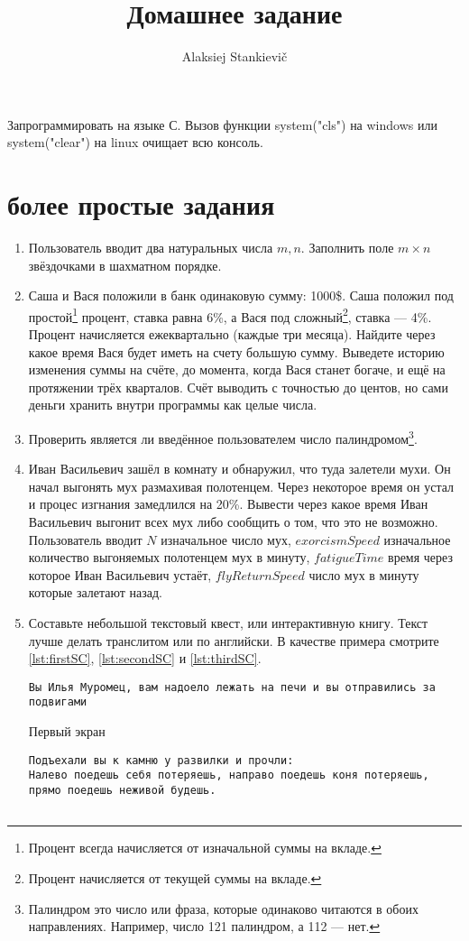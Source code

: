 \documentclass[12pt]{article}
\author{Alaksiej Stankievič}
\title{Домашнее задание}
\begin{document}

 Запрограммировать на языке С. Вызов функции system("cls") на windows или system("clear") на  linux очищает всю консоль.
 \section{более простые задания}
 \begin{enumerate}
\item Пользователь вводит два натуральных числа $m, n$. Заполнить поле $m\times{}n$ звёздочками в шахматном порядке.
  \item Саша и Вася положили в банк одинаковую сумму: 1000\$. Саша положил под простой\footnote{Процент всегда 
  начисляется от изначальной суммы на вкладе.} процент, ставка равна 6\%, а Вася под сложный\footnote{Процент 
начисляется от текущей суммы на вкладе.}, ставка --- 4\%. Процент начисляется ежеквартально (каждые три месяца). 
Найдите 
через какое время Вася будет иметь на счету большую сумму. Выведете  историю изменения суммы на счёте, до момента, 
когда 
Вася станет богаче, и ещё на протяжении трёх кварталов. Счёт выводить с точностью до центов, но сами деньги хранить 
внутри программы как целые числа.
  \item Проверить является ли введённое пользователем число палиндромом\footnote{Палиндром это число или фраза, 
  которые одинаково читаются в обоих направлениях. Например, число 121 палиндром, а 112 --- нет.}.
  \item Иван Васильевич зашёл в комнату и обнаружил, что туда залетели мухи. Он начал выгонять мух размахивая 
  полотенцем. Через некоторое время он устал и процес изгнания замедлился на 20\%. Вывести через какое время Иван 
Васильевич выгонит всех мух либо сообщить о том, что это не возможно. Пользователь вводит $N$ изначальное число мух, 
$exorcismSpeed$ изначальное количество выгоняемых полотенцем мух в минуту, $fatigueTime$ время через которое Иван 
Васильевич устаёт, $flyReturnSpeed$ число мух в минуту которые залетают назад.
  \item Составьте небольшой текстовый квест, или интерактивную книгу. Текст лучше делать транслитом или по английски. 
  В качестве примера смотрите \ref{lst:firstSC}, \ref{lst:secondSC} и \ref{lst:thirdSC}.
    \begin{listing}[H]
\begin{verbatim}
Вы Илья Муромец, вам надоело лежать на печи и вы отправились за подвигами
\end{verbatim}
\caption{Первый экран}
\label{lst:firstSC}
\end{listing}
\begin{listing}[H]
\begin{verbatim}
Подъехали вы к камню у развилки и прочли:
Налево поедешь себя потеряешь, направо поедешь коня потеряешь,
прямо поедешь неживой будешь.


\end{verbatim}
\end{listing}
\end{enumerate}
\end{document}
